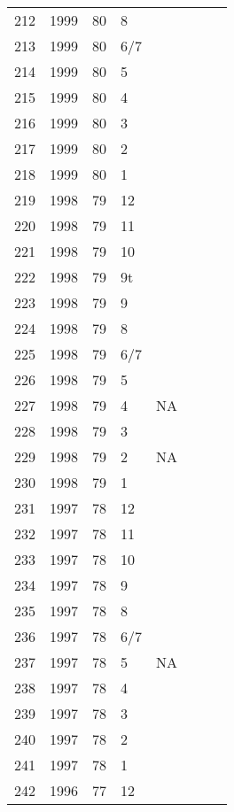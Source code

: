 \begin{longtable}{ |l|l|l|l|l|l|l|l| }
212 & 1999 & 80 &     8 &         &  &  & \\
213 & 1999 & 80 &   6/7 &         &  &  & \\
214 & 1999 & 80 &     5 &         &  &  & \\
215 & 1999 & 80 &     4 &         &  &  & \\
216 & 1999 & 80 &     3 &         &  &  & \\
217 & 1999 & 80 &     2 &         &  &  & \\
218 & 1999 & 80 &     1 &         &  &  & \\
219 & 1998 & 79 &    12 &         &  &  & \\
220 & 1998 & 79 &    11 &         &  &  & \\
221 & 1998 & 79 &    10 &         &  &  & \\
222 & 1998 & 79 &    9t &         &  &  & \\
223 & 1998 & 79 &     9 &         &  &  & \\
224 & 1998 & 79 &     8 &         &  &  & \\
225 & 1998 & 79 &   6/7 &         &  &  & \\
226 & 1998 & 79 &     5 &         &  &  & \\
227 & 1998 & 79 &     4 &     NA  &  &  & \\
228 & 1998 & 79 &     3 &         &  &  & \\
229 & 1998 & 79 &     2 &     NA  &  &  & \\
230 & 1998 & 79 &     1 &         &  &  & \\
231 & 1997 & 78 &    12 &         &  &  & \\
232 & 1997 & 78 &    11 &         &  &  & \\
233 & 1997 & 78 &    10 &         &  &  & \\
234 & 1997 & 78 &     9 &         &  &  & \\
235 & 1997 & 78 &     8 &         &  &  & \\
236 & 1997 & 78 &   6/7 &         &  &  & \\
237 & 1997 & 78 &     5 &     NA  &  &  & \\
238 & 1997 & 78 &     4 &         &  &  & \\
239 & 1997 & 78 &     3 &         &  &  & \\
240 & 1997 & 78 &     2 &         &  &  & \\
241 & 1997 & 78 &     1 &         &                &  & \\
242 & 1996 & 77 &    12 &         &                &  & \\

\end{longtable}
